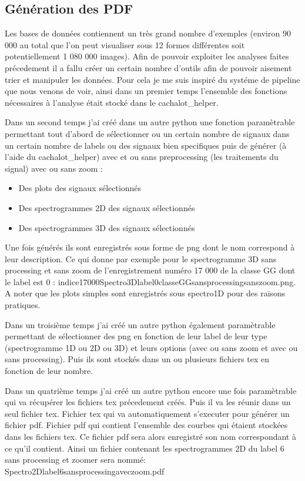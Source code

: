 \hypertarget{Guxe9nuxe9ration-des-PDF}{%
\subsection{Génération des PDF}
\label{Guxe9nuxe9ration-des-PDF}}

Les bases de données contiennent un très grand nombre d'exemples (environ 90 000 au total que l'on peut visualiser sous 12 formes différentes soit potentiellement 1 080 000 images).
Afin de pouvoir exploiter les analyses faites précedement il a fallu créer un certain nombre d'outils afin de pouvoir aisement trier et manipuler les données.
Pour cela je me suis inspiré du systéme de pipeline que nous venons de voir, ainsi dans un premier temps l'ensemble des fonctions nécessaires à l'analyse était stocké dans le cachalot{\_}helper.

Dans un second temps j'ai créé dans un autre python une fonction paramètrable permettant tout d'abord de sélectionner ou un certain nombre de signaux dans un certain nombre de labels ou des signaux bien specifiques puis de générer (à l'aide du cachalot{\_}helper) avec et ou sans preprocessing (les traitements du signal) avec ou sans zoom :
\begin{itemize}
\item Des plots des signaux sélectionnés
\item Des spectrogrammes 2D des signaux sélectionnés
\item Des spectrogrammes 3D des signaux sélectionnés
\end{itemize}
Une fois générés ils sont enregistrés sous forme de png dont le nom correspond à leur description. Ce qui donne par exemple pour le spectrogramme 3D sans processing et sans zoom de l'enregistrement numéro 17 000 de la classe GG dont le label est 0 :
indice17000Spectro3Dlabel0classeGGsansprocessingsanszoom.png. A noter que les plots simples sont enregistrés sous spectro1D pour des raisons pratiques.

Dans un troisième temps j'ai créé un autre python également paramètrable permettant de sélectionner des png en fonction de leur label de leur type (spectrogramme 1D ou 2D ou 3D) et leurs options (avec ou sans zoom et avec ou sans processing). Puis ils sont stockés dans un ou plusieurs fichiers tex en fonction de leur nombre.

Dans un quatrième temps j'ai créé un autre python encore une fois paramètrable qui va récupérer les fichiers tex précedement créés. Puis il va les réunir dans un seul fichier tex. Fichier tex qui va automatiquement s'executer pour générer un fichier pdf. Fichier pdf qui contient l'ensemble des courbes qui étaient stockées dans les fichiers tex. Ce fichier pdf sera alors enregistré son nom correspondant à ce qu'il contient. Ainsi un fichier contenant les spectrogrammes 2D du label 6 sans processing et zoomer sera nommé: Spectro2Dlabel6sansprocessingaveczoom.pdf

